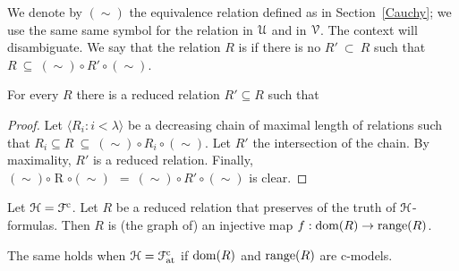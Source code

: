 \documentclass{amsproc}
\renewcommand*{\emph}[1]{%
   \smash{\tikz[baseline]\node[rectangle, fill=teal!25, rounded corners, inner xsep=0.5ex, inner ysep=0.2ex, anchor=base, minimum height = 2.7ex]{\strut #1};}}
\begin{document}
{We denote by $(\sim)$ the equivalence relation defined as in Section~\ref{Cauchy}; we use the same same symbol for the relation in ${\EuScript U}$ and in ${\EuScript V}$.
The context will disambiguate.
We say that the relation $R$ is \emph{reduced\/} if there is no $R'\ \subset\ R$ such that $R\ \subseteq\ \mathrel{(\sim)}\circ \mathrel{R'}\circ\mathrel{(\sim)}$.

\begin{fact}
  For every $R$ there is a reduced relation $R'\subseteq R$ such that 
  
\end{fact}

\begin{proof}
  Let $\langle R_i:i<\lambda\rangle$ be a decreasing chain of maximal length of relations such that $R_i\mathrel{\subseteq}R\ \subseteq\ \mathrel{(\sim)}\circ \mathrel{R_i}\circ\mathrel{(\sim)}$.
  Let  $R'$ the intersection  of the chain.
  By maximality, $R'$ is a reduced relation.
  Finally, $\mathrel{(\sim)}\circ \mathrel{R}\circ\mathrel{(\sim)}\ \ =\ \mathrel{(\sim)}\circ \mathrel{R'}\circ\mathrel{(\sim)}$ is clear.
\end{proof}




\begin{fact}\label{fact_reduced_funct} 
  Let ${\EuScript H}={\EuScript F}^{\rm c}$.
  Let $R$ be a reduced relation that preserves of the truth of ${\EuScript H}$-formulas.
  Then $R$ is (the graph of) an injective map $f:{\rm dom}(R)\to{\rm range}(R)$.

  The same holds when ${\EuScript H}={\EuScript F}^{\rm c}_{\rm at}$ if ${\rm dom}(R)$ and ${\rm range}(R)$ are c-models.
\end{fact}

}
\end{document}
